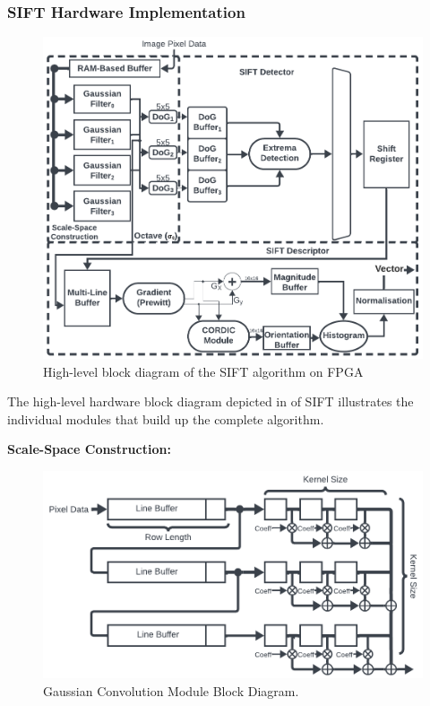 \subsubsection*{SIFT Hardware Implementation}\label{SIFTHardwareDesc}
\begin{figure}[h]
    \centering
     \includegraphics[width=\columnwidth]{Images/SIFTBLOCK.png}
    \caption{High-level block diagram of the SIFT algorithm on FPGA}
    \label{fig:SIFTBlock}
\end{figure}

The high-level hardware block diagram depicted in  of  SIFT illustrates the individual modules that build up the complete algorithm.


\textbf{Scale-Space Construction:}

\begin{figure}[h]
    \centering
     \includegraphics[width=\columnwidth]{Images/ScaleSpaceModule.png}
    \caption{Gaussian Convolution Module Block Diagram.}
    \label{fig:GaussModule}
\end{figure}


